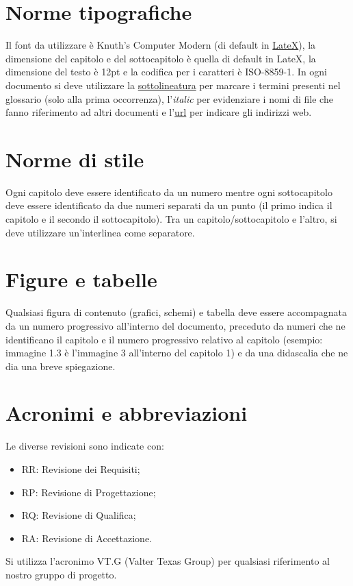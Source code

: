 \section{Norme tipografiche}
Il font da utilizzare \`e Knuth's Computer Modern (di default in
\underline{LateX}), la dimensione del capitolo e del sottocapitolo \`e quella di
default in LateX, la dimensione del testo \`e 12pt e la codifica per i caratteri
\`e ISO-8859-1. In ogni documento si deve utilizzare la \underline{sottolineatura} per marcare i termini presenti nel glossario (solo
alla prima occorrenza), l'\emph{italic} per evidenziare i nomi di file che
fanno riferimento ad altri documenti e l'\url{url} per indicare gli indirizzi
web.

\section{Norme di stile}
Ogni capitolo deve essere identificato da un numero mentre ogni sottocapitolo
deve essere identificato da due numeri separati da un punto (il primo indica il
capitolo e il secondo il sottocapitolo). Tra un capitolo/sottocapitolo e
l'altro, si deve utilizzare un'interlinea come separatore.

\section{Figure e tabelle}
Qualsiasi figura di contenuto (grafici, schemi) e tabella deve essere
accompagnata da un numero progressivo all'interno del documento, preceduto da
numeri che ne identificano il capitolo e il numero progressivo relativo al capitolo (esempio: immagine 1.3
\`e l'immagine 3 all'interno del capitolo 1) e da una
didascalia che ne dia una breve spiegazione.

\section{Acronimi e abbreviazioni}
Le diverse revisioni sono indicate con:
\begin{itemize}
\item {RR: Revisione dei Requisiti;}
\item {RP: Revisione di Progettazione; }
\item {RQ: Revisione di Qualifica;}
\item {RA: Revisione di Accettazione.}
\end{itemize}
Si utilizza l'acronimo VT.G (Valter Texas Group) per qualsiasi riferimento al
nostro gruppo di progetto.



